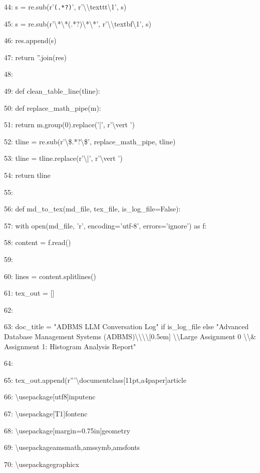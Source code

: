 \documentclass[11pt,a4paper]{article}
\begin{document}
44:             s = re.sub(r'\texttt{(.*?)}', r'\textbackslash{}\textbackslash{}texttt{\textbackslash{}1}', s)

45:             s = re.sub(r'\textbackslash{}*\textbackslash{}*(.*?)\textbackslash{}*\textbackslash{}*', r'\textbackslash{}\textbackslash{}textbf{\textbackslash{}1}', s)

46:             res.append(s)

47:     return ''.join(res)

48:

49: def clean\_table\_line(tline):

50:     def replace\_math\_pipe(m):

51:         return m.group(0).replace('|', r'\textbackslash{}vert ')

52:     tline = re.sub(r'\textbackslash{}\$.*?\textbackslash{}\$', replace\_math\_pipe, tline)

53:     tline = tline.replace(r'\textbackslash{}|', r'\textbackslash{}vert ')

54:     return tline

55:

56: def md\_to\_tex(md\_file, tex\_file, is\_log\_file=False):

57:     with open(md\_file, 'r', encoding='utf-8', errors='ignore') as f:

58:         content = f.read()

59:

60:     lines = content.splitlines()

61:     tex\_out = []

62:

63:     doc\_title = "ADBMS LLM Conversation Log" if is\_log\_file else "Advanced Database Management Systems (ADBMS)\textbackslash{}\textbackslash{}\textbackslash{}\textbackslash{}[0.5em] \textbackslash{}\textbackslash{}Large Assignment 0 \textbackslash{}\textbackslash{}\& Assignment 1: Histogram Analysis Report"

64:

65:     tex\_out.append(r'''\textbackslash{}documentclass[11pt,a4paper]{article}

66: \textbackslash{}usepackage[utf8]{inputenc}

67: \textbackslash{}usepackage[T1]{fontenc}

68: \textbackslash{}usepackage[margin=0.75in]{geometry}

69: \textbackslash{}usepackage{amsmath,amssymb,amsfonts}

70: \textbackslash{}usepackage{graphicx}
\end{document}
